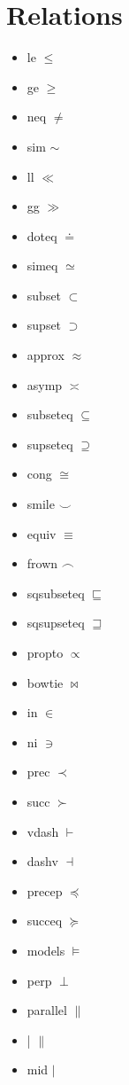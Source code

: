 \documentclass[11pt]{article}  %
\begin{document}
\section*{Relations}
\begin{itemize}
\item le $\le$
\item ge $\ge$
\item neq $\neq$
\item sim $\sim$
\item ll $\ll$
\item gg $\gg$
\item doteq $\doteq$
\item simeq $\simeq$
\item subset $\subset$
\item supset $\supset$
\item approx $\approx$
\item asymp $\asymp$
\item subseteq $\subseteq$
\item supseteq $\supseteq$
\item cong $\cong$
\item smile $\smile$
\item equiv $\equiv$
\item frown $\frown$
\item sqsubseteq $\sqsubseteq$
\item sqsupseteq $\sqsupseteq$
\item propto $\propto$
\item bowtie $\bowtie$
\item in $\in$
\item ni $\ni$
\item prec $\prec$
\item succ $\succ$
\item vdash $\vdash$
\item dashv $\dashv$
\item precep $\preceq$
\item succeq $\succeq$
\item models $\models$
\item perp $\perp$
\item parallel $\parallel$
\item | $\|$
\item mid $\mid$
\end{itemize}
\end{document}
